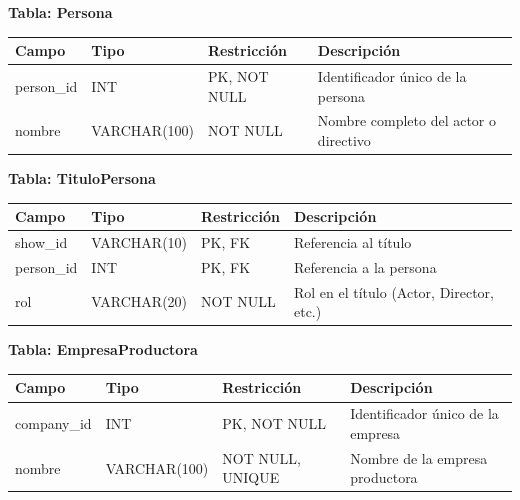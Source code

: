 \documentclass[12pt,a4paper]{article}
\begin{document}
\vspace{0.5cm}

\textbf{Tabla: Persona}

\vspace{0.2cm}
\begin{center}
\begin{tabular}{>{\ttfamily}p{3.8cm} p{2.8cm} p{2.5cm} p{5cm}}
\toprule
\normalfont Campo & Tipo & Restricci\'on & Descripci\'on \\
\midrule
person\_id & INT           & PK, NOT NULL  & Identificador \'unico de la persona \\
nombre     & VARCHAR(100)  & NOT NULL      & Nombre completo del actor o directivo \\
\bottomrule
\end{tabular}
\end{center}

\vspace{0.5cm}

\textbf{Tabla: TituloPersona}

\vspace{0.2cm}
\begin{center}
\begin{tabular}{>{\ttfamily}p{3.8cm} p{2.8cm} p{2.5cm} p{5cm}}
\toprule
\normalfont Campo & Tipo & Restricci\'on & Descripci\'on \\
\midrule
show\_id   & VARCHAR(10)   & PK, FK        & Referencia al t\'itulo \\
person\_id & INT           & PK, FK        & Referencia a la persona \\
rol        & VARCHAR(20)   & NOT NULL      & Rol en el t\'itulo (Actor, Director, etc.) \\
\bottomrule
\end{tabular}
\end{center}

\vspace{0.5cm}

\textbf{Tabla: EmpresaProductora}

\vspace{0.2cm}
\begin{center}
\begin{tabular}{>{\ttfamily}p{3.8cm} p{2.8cm} p{2.5cm} p{5cm}}
\toprule
\normalfont Campo & Tipo & Restricci\'on & Descripci\'on \\
\midrule
company\_id & INT          & PK, NOT NULL  & Identificador \'unico de la empresa \\
nombre      & VARCHAR(100) & NOT NULL, UNIQUE & Nombre de la empresa productora \\
\bottomrule
\end{tabular}
\end{center}
\end{document}
